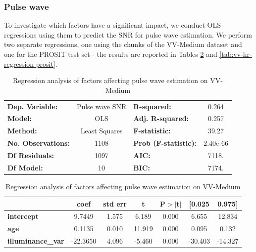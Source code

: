 \documentclass{article}
\begin{document}
\subsubsection{Pulse wave}

To investigate which factors have a significant impact, we conduct OLS regressions using them to predict the SNR for pulse wave estimation.
We perform two separate regressions, one using the chunks of the VV-Medium dataset and one for the PROSIT test set - the results are reported in Tables \ref{tab:vv-hr-regression-vv} and \ref{tab:vv-hr-regression-prosit}.

\begin{table}[h!]
\begin{center}
\caption{Regression analysis of factors affecting pulse wave estimation on VV-Medium}
\label{tab:vv-hr-regression-vv}
\begin{tabular}{lclc}
\toprule
\textbf{Dep. Variable:}          &  Pulse wave SNR  & \textbf{  R-squared:         } &     0.264   \\
\textbf{Model:}                  &       OLS        & \textbf{  Adj. R-squared:    } &     0.257   \\
\textbf{Method:}                 &  Least Squares   & \textbf{  F-statistic:       } &     39.27   \\
\textbf{No. Observations:}       &        1108      & \textbf{  Prob (F-statistic):} &  2.40e-66   \\
\textbf{Df Residuals:}           &        1097      & \textbf{  AIC:               } &     7118.   \\
\textbf{Df Model:}               &          10      & \textbf{  BIC:               } &     7174.   \\
\bottomrule
\end{tabular}
\begin{tabular}{lcccccc}
                                 & \textbf{coef} & \textbf{std err} & \textbf{t} & \textbf{P$> |$t$|$} & \textbf{[0.025} & \textbf{0.975]}  \\
\midrule
\textbf{intercept}               &       9.7449  &        1.575     &     6.189  &         0.000        &        6.655    &       12.834     \\
\textbf{age}                     &       0.1135  &        0.010     &    11.919  &         0.000        &        0.095    &        0.132     \\
\textbf{illuminance\_var}        &     -22.3650  &        4.096     &    -5.460  &         0.000        &      -30.403    &      -14.327     \\

\end{tabular}
\end{center}
\end{table}
\end{document}

